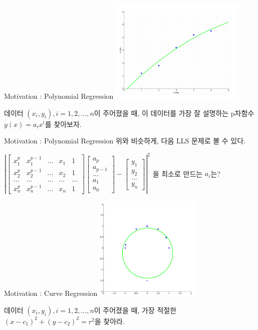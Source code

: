 \documentclass{beamer}
\begin{document}
\begin{frame}{Motivation : Polynomial Regression} 
\includegraphics[height=5cm,keepaspectratio]{poly}

데이터 $(x_i, y_i), i=1,2,...,n$이 주어졌을 때, 이 데이터를 가장 잘 설명하는 p차함수 $y(x) = a_ix^i$를 찾아보자. 
\end{frame}


\begin{frame}{Motivation : Polynomial Regression} 
위와 비슷하게, 다음 LLS 문제로 볼 수 있다. 
\vspace{5mm}

$ \left| \left[ \begin{matrix} 
x_1^p & x_1^{p-1} & ... & x_1 & 1 \\  
x_2^p & x_2^{p-1} & ... & x_2 & 1 \\
... & ... & ... & ... & ... \\
x_n^p & x_n^{p-1} & ... & x_n & 1 
\end{matrix} \right] \left[ \begin{matrix} 
a_p \\
a_{p-1} \\
... \\ 
a_1 \\
a_0 \end{matrix} \right] - \left[ \begin{matrix}
y_1 \\
y_2 \\ 
... \\ 
y_n \end{matrix} \right] \right|^2 
$ 을 최소로 만드는 $a_i$는?

\end{frame}

\begin{frame}{Motivation : Curve Regression} 
\includegraphics[height=5cm,keepaspectratio]{circle}

데이터 $(x_i, y_i), i=1,2,...,n$이 주어졌을 때, 가장 적절한 $(x-c_1)^2 + (y-c_2)^2 = r^2$을 찾아라. 
\end{frame}
\end{document}
